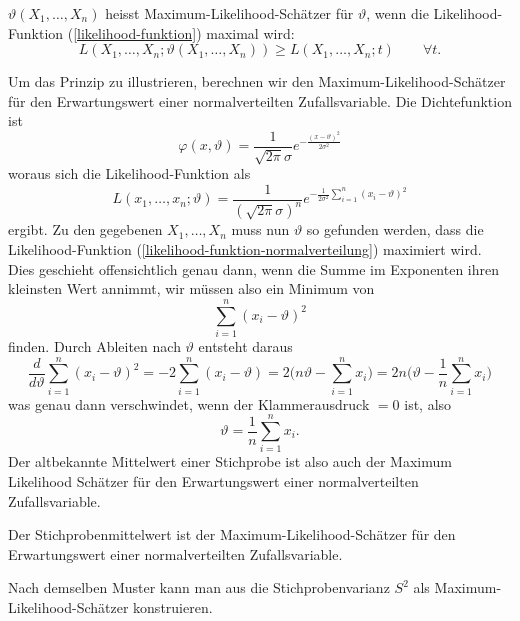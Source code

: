 \begin{definition}
$\vartheta(X_1,\dots,X_n)$ heisst Maximum-Likelihood-Schätzer für
$\vartheta$, wenn die Likelihood-Funktion (\ref{likelihood-funktion})
maximal wird:
\begin{equation}
L(X_1,\dots,X_n;\vartheta(X_1,\dots,X_n)) \ge L(X_1,\dots,X_n;t)\qquad\forall t.
\end{equation}
\end{definition}

Um das Prinzip zu illustrieren, berechnen wir den
Maximum-Likelihood-Schätzer für den Erwartungswert
einer normalverteilten Zufallsvariable.
Die Dichtefunktion ist 
\[
\varphi(x,\vartheta)
=
\frac1{\sqrt{2\pi}\sigma}e^{-\frac{(x-\vartheta)^2}{2\sigma^2}}
\]
woraus sich die Likelihood-Funktion als
\begin{equation}
L(x_1,\dots,x_n;\vartheta)
=
\frac1{(\sqrt{2\pi}\sigma)^n}e^{-\frac1{2\sigma^2}\sum_{i=1}^n(x_i-\vartheta)^2}
\label{likelihood-funktion-normalverteilung}
\end{equation}
ergibt.
Zu den gegebenen $X_1,\dots,X_n$ muss nun $\vartheta$ so gefunden
werden, dass die Likelihood-Funktion
(\ref{likelihood-funktion-normalverteilung}) maximiert wird.
Dies geschieht offensichtlich genau dann, wenn die Summe im Exponenten
ihren kleinsten Wert annimmt, wir müssen also ein Minimum von
\begin{equation}
\sum_{i=1}^n (x_i-\vartheta)^2
\end{equation}
finden.
Durch Ableiten nach $\vartheta$ entsteht daraus
\begin{equation}
\frac{d}{d\vartheta}
\sum_{i=1}^n (x_i-\vartheta)^2
=
-2\sum_{i=1}^n (x_i-\vartheta)
=
2\biggl(n\vartheta-\sum_{i=1}^nx_i\biggr)
=
2n\biggl(\vartheta-\frac1n\sum_{i=1}^nx_i\biggr)
\end{equation}
was genau dann verschwindet, wenn der Klammerausdruck $=0$ ist, also
\begin{equation}
\vartheta=\frac1n\sum_{i=1}^nx_i.
\end{equation}
Der altbekannte Mittelwert einer Stichprobe ist also auch der
Maximum Likelihood Schätzer für den Erwartungswert einer normalverteilten
Zufallsvariable.
\begin{satz}
Der Stichprobenmittelwert ist der Maximum-Likelihood-Schätzer
für den Erwartungswert einer normalverteilten Zufallsvariable.
\end{satz}
Nach demselben Muster kann man aus die Stichprobenvarianz $S^2$ als
Maximum-Likelihood-Schätzer konstruieren.

